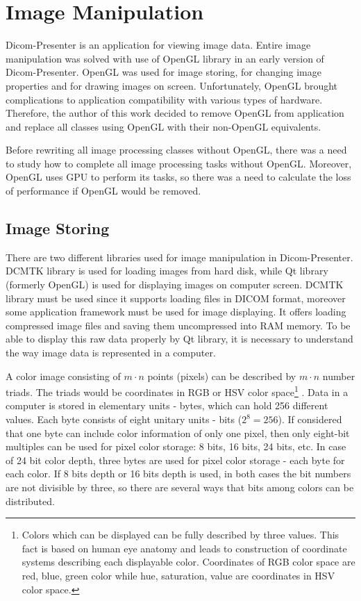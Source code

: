 \chapter{Image Manipulation}
\vspace{-10mm}

Dicom-Presenter is an application for viewing image data. Entire image manipulation was solved with use of OpenGL library in an early version of Dicom-Presenter. OpenGL was used for image storing, for changing image properties and for drawing images on screen. Unfortunately, OpenGL brought complications to application compatibility with various types of hardware. Therefore, the author of this work decided to remove OpenGL from application and replace all classes using OpenGL with their non-OpenGL equivalents. 

Before rewriting all image processing classes without OpenGL, there was a need to study how to complete all image processing tasks without OpenGL. Moreover, OpenGL uses GPU to perform its tasks, so there was a need to calculate the loss of performance if OpenGL would be removed. 

\section{Image Storing}
\label{rawdata}
There are two different libraries used for image manipulation in Dicom-Presenter. DCMTK library is used for loading images from hard disk, while Qt library (formerly OpenGL) is used for displaying images on computer screen. DCMTK library must be used since it supports loading files in DICOM format, moreover some application framework must be used for image displaying. It offers loading compressed image files and saving them uncompressed into RAM memory. To be able to display this raw data properly by Qt library, it is necessary to understand the way image data is represented in a computer. 

A color image consisting of $m \cdot n$ points (pixels) can be described by $m \cdot n$ number triads. The triads would be coordinates in RGB or HSV color space\footnote{Colors which can be displayed can be fully described by three values. This fact is based on human eye anatomy and leads to construction of coordinate systems describing each displayable color. Coordinates of RGB color space are red, blue, green color while hue, saturation, value are coordinates in HSV color space.} \cite[page~211]{imageprocessingintroduction}. Data in a computer is stored in elementary units - bytes, which can hold 256 different values. Each byte consists of eight unitary units - bits ($2^8 = 256 $). If considered that one byte can include color information of only one pixel, then only eight-bit multiples can be used for pixel color storage: 8 bits, 16 bits, 24 bits, etc.\cite[page~208]{colorphotography} In case of 24 bit color depth, three bytes are used for pixel color storage - each byte for each color. If 8 bits depth or 16 bits depth is used, in both cases the bit numbers are not divisible by three, so there are several ways that bits among colors can be distributed.
 
